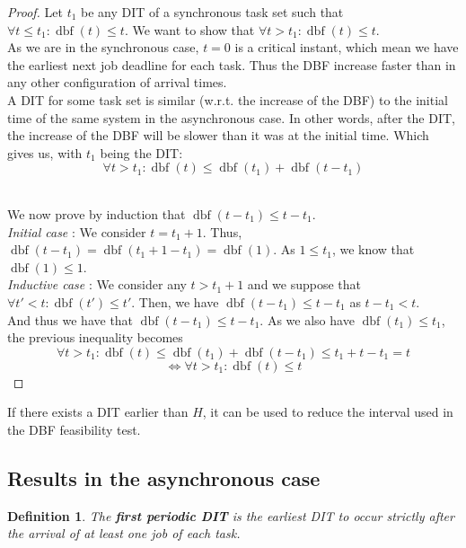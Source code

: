 \documentclass[a4paper,10pt]{article}
\newcommand{\dbf}[1]{\operatorname{dbf}(#1)}
\newtheorem{definition}{Definition}
\begin{document}
\begin{proof}
Let $t_1$ be any DIT of a synchronous task set such that $\forall t \leq t_1 : \dbf{t} \leq t$. We want to show that $\forall t > t_1 : \dbf{t} \leq t$.\\

As we are in the synchronous case, $t=0$ is a critical instant, which mean we have the earliest next job deadline for each task. Thus the DBF increase faster than in any other configuration of arrival times.\\

A DIT for some task set is similar (w.r.t. the increase of the DBF) to the initial time of the same system in the asynchronous case. In other words, after the DIT, the increase of the DBF will be slower than it was at the initial time. Which gives us, with $t_1$ being the DIT:
$$\forall t > t_1 : \dbf{t} \leq \dbf{t_1} + \dbf{t-t_1}$$

~\\

We now prove by induction that $\dbf{t-t_1} \leq t - t_1$.\\

\emph{Initial case} : We consider $t = t_1 + 1$. Thus, $\dbf{t-t_1} = \dbf{t_1 + 1 - t_1} = \dbf{1}$. As $1 \leq t_1$, we know that $\dbf{1} \leq 1$.\\

\emph{Inductive case} : We consider any $t > t_1 + 1$ and we suppose that $\forall t' < t : \dbf{t'} \leq t'$. Then, we have $\dbf{t - t_1} \leq t - t_1$ as $t - t_1 < t$.\\

And thus we have that $\dbf{t-t_1} \leq t - t_1$. As we also have $\dbf{t_1} \leq t_1$, the previous inequality becomes
$$\forall t > t_1 : \dbf{t} \leq \dbf{t_1} + \dbf{t-t_1} \leq t_1 + t - t_1 = t$$
$$\iff \forall t > t_1 : \dbf{t} \leq t$$
\end{proof}

If there exists a DIT earlier than $H$, it can be used to reduce the interval used in the DBF feasibility test.

\subsection{Results in the asynchronous case}

\begin{definition}
The \textbf{first periodic DIT} is the earliest DIT to occur strictly after the arrival of at least one job of each task.
\end{definition}
\end{document}
